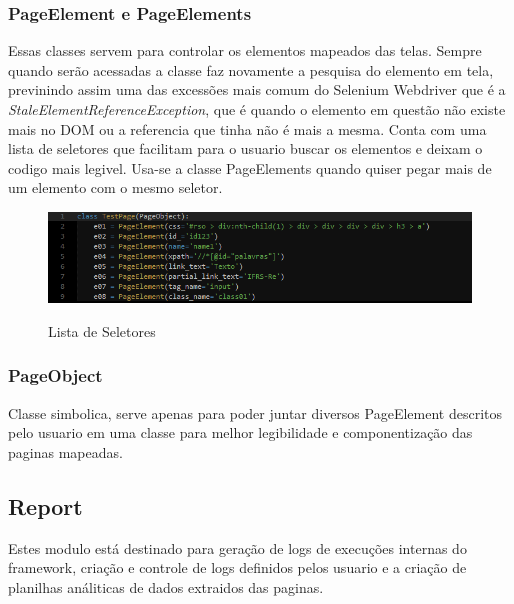             \subsubsection{PageElement e PageElements}
            \label{PageElement}
                Essas classes servem para controlar os elementos mapeados das telas. Sempre quando serão acessadas a classe faz novamente a pesquisa
                do elemento em tela, previnindo assim uma das excessões mais comum do Selenium Webdriver que é a \emph{StaleElementReferenceException},
                que é quando o elemento em questão não existe mais no DOM ou a referencia que tinha não é mais a mesma. Conta com uma lista de seletores
                que facilitam para o usuario buscar os elementos e deixam o codigo mais legivel. Usa-se a classe PageElements quando quiser pegar mais
                de um elemento com o mesmo seletor.

                \begin{figure}[H]
                    \vspace*{0,3cm}
                    \centering
                    \caption{Lista de Seletores}
                    \includegraphics[width=1\textwidth]{./04-figuras/selectors}
                    \label{fig:selectors.png}
                \end{figure}

            \subsubsection{PageObject}
                Classe simbolica, serve apenas para poder juntar diversos PageElement descritos pelo usuario em uma classe para melhor
                legibilidade e componentização das paginas mapeadas.

        \subsection{Report}

            Estes modulo está destinado para geração de logs de execuções internas do framework, criação e controle
            de logs definidos pelos usuario e a criação de planilhas análiticas de dados extraidos das paginas.

